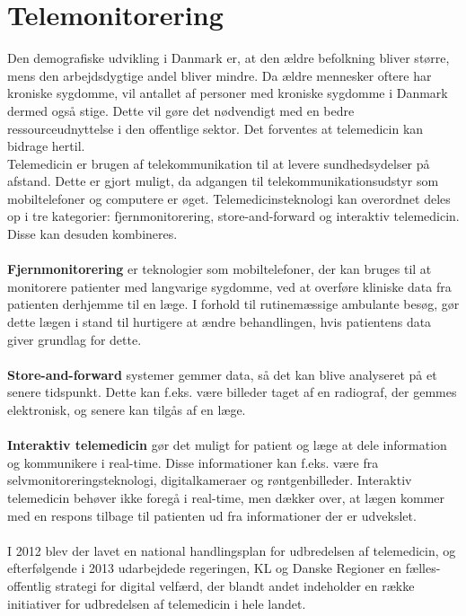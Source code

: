 \section{Telemonitorering}
Den demografiske udvikling i Danmark er, at den ældre befolkning bliver større, mens den arbejdsdygtige andel bliver mindre. Da ældre mennesker oftere har kroniske sygdomme, vil antallet af personer med kroniske sygdomme i Danmark dermed også stige. Dette vil gøre det nødvendigt med en bedre ressourceudnyttelse i den offentlige sektor. Det forventes at telemedicin kan bidrage hertil. \citep{erfaringsopsamlingTelemedicin}\\
Telemedicin er brugen af telekommunikation til at levere sundhedsydelser på afstand. Dette er gjort muligt, da adgangen til telekommunikationsudstyr som mobiltelefoner og computere er øget.
Telemedicinsteknologi kan overordnet deles op i tre kategorier: fjernmonitorering, store-and-forward og interaktiv telemedicin. Disse kan desuden kombineres. \citep{InteractiveTelemedicine}\\
\\
\textbf{Fjernmonitorering} er teknologier som mobiltelefoner, der kan bruges til at monitorere patienter med langvarige sygdomme, ved at overføre kliniske data fra patienten derhjemme til en læge. I forhold til rutinemæssige ambulante besøg, gør dette lægen i stand til hurtigere at ændre behandlingen, hvis patientens data giver grundlag for dette. \citep{InteractiveTelemedicine}\\
\\
\textbf{Store-and-forward} systemer gemmer data, så det kan blive analyseret på et senere tidspunkt. Dette kan f.eks. være billeder taget af en radiograf, der gemmes elektronisk, og senere kan tilgås af en læge. \citep{InteractiveTelemedicine}\\
\\
\textbf{Interaktiv telemedicin} gør det muligt for patient og læge at dele information og kommunikere i real-time. Disse informationer kan f.eks. være fra selvmonitoreringsteknologi, digitalkameraer og røntgenbilleder. Interaktiv telemedicin behøver ikke foregå i real-time, men dækker over, at lægen kommer med en respons tilbage til patienten ud fra informationer der er udvekslet. \citep{InteractiveTelemedicine}\\
\\
I 2012 blev der lavet en national handlingsplan for udbredelsen af telemedicin, og efterfølgende i 2013 udarbejdede regeringen, KL og Danske Regioner en fælles-offentlig strategi for digital velfærd, der blandt andet indeholder en række initiativer for udbredelsen af telemedicin i hele landet. \citep{erfaringsopsamlingTelemedicin}\\
\\
